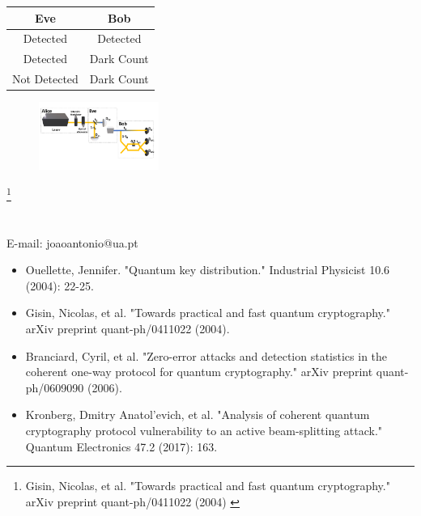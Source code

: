 \documentclass[1000pt]{article}
\newcommand{\mysection}[1]{\section*{\color{black}\sffamily #1}}%
\newcommand{\cref}[1]{{\fontsize{17pt}{0cm}\selectfont\color{black} #1}}%
\newcommand\blfootnote[1]{%
  \begingroup
  \renewcommand\thefootnote{}\footnote{#1}%
  \addtocounter{footnote}{-1}%
  \endgroup
}
\begin{document}
\begin{table}[hbt]
\centering
\begin{tabular}{|c|c|}
\hline
Eve          & Bob        \\ \hline
Detected     & Detected   \\ \hline
Detected     & Dark Count \\ \hline
Not Detected & Dark Count \\ \hline
\end{tabular}
\end{table}
	


\begin{figure}[hbt]
    	\centering
    	\includegraphics[width=0.35\textwidth]{./figures/E.pdf}
    \end{figure}
    
\blfootnote{
\hspace*{12cm}
\begin{minipage}{26cm}
\cref{
Gisin, Nicolas, et al. "Towards practical and fast quantum cryptography." arXiv preprint quant-ph/0411022 (2004)
}
\end{minipage}
}
\fi
\mysection{} \sffamily \Large
\vspace{-10mm}
\centerline{E-mail: joaoantonio@ua.pt}
\vspace*{7cm}
\begin{itemize}
	\item Ouellette, Jennifer. "Quantum key distribution." Industrial Physicist 10.6 (2004): 22-25.
	\item Gisin, Nicolas, et al. "Towards practical and fast quantum cryptography." arXiv preprint quant-ph/0411022 (2004).
	\item Branciard, Cyril, et al. "Zero-error attacks and detection statistics in the coherent one-way protocol for quantum cryptography." arXiv preprint quant-ph/0609090 (2006).
	\item Kronberg, Dmitry Anatol'evich, et al. "Analysis of coherent quantum cryptography protocol vulnerability to an active beam-splitting attack." Quantum Electronics 47.2 (2017): 163.
\end{itemize}
\end{document}
